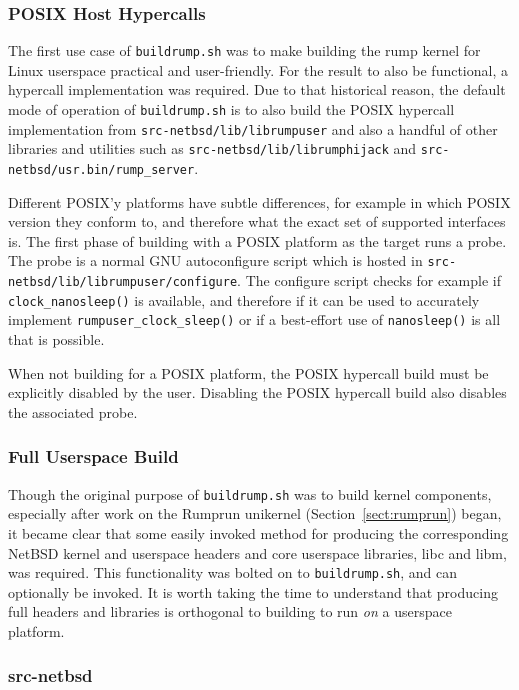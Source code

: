 \subsubsection{POSIX Host Hypercalls}

The first use case of \texttt{buildrump.sh} was to make building the
rump kernel for Linux userspace practical and user-friendly.  For
the result to also be functional, a hypercall implementation
was required.  Due to that historical reason, the default mode of
operation of \texttt{buildrump.sh} is to also build the POSIX hypercall
implementation from \texttt{src-netbsd/lib/librumpuser} and also a handful
of other libraries and utilities such as \texttt{src-netbsd/lib/librumphijack}
and \verb+src-netbsd/usr.bin/rump_server+.

Different POSIX'y platforms have subtle differences, for example in
which POSIX version they conform to, and therefore what the exact set
of supported interfaces is.
The first phase of building with a POSIX platform as the target runs
a probe.  The probe is a normal GNU autoconfigure script which is hosted
in \texttt{src-netbsd/lib/librumpuser/configure}.  The configure script
checks for example if \verb+clock_nanosleep()+ is available, and therefore
if it can be used to accurately implement \verb+rumpuser_clock_sleep()+
or if a best-effort use of \verb+nanosleep()+ is all that is possible.

When not building for a POSIX platform, the POSIX hypercall build must
be explicitly disabled by the user.  Disabling the POSIX hypercall build
also disables the associated probe.


\subsubsection{Full Userspace Build}

Though the original purpose of \texttt{buildrump.sh} was to build
kernel components, especially after work on the Rumprun unikernel
(Section~\ref{sect:rumprun}) began, it became clear that some easily
invoked method for
producing the corresponding NetBSD kernel and userspace headers and core
userspace libraries, \eg libc and libm, was required.  This functionality
was bolted on to \texttt{buildrump.sh}, and can optionally be invoked.
It is worth taking the time to understand that producing full headers and libraries
is orthogonal to building to run \textit{on} a userspace platform.


\subsubsection{src-netbsd}
\label{sect:srcnetbsd}

